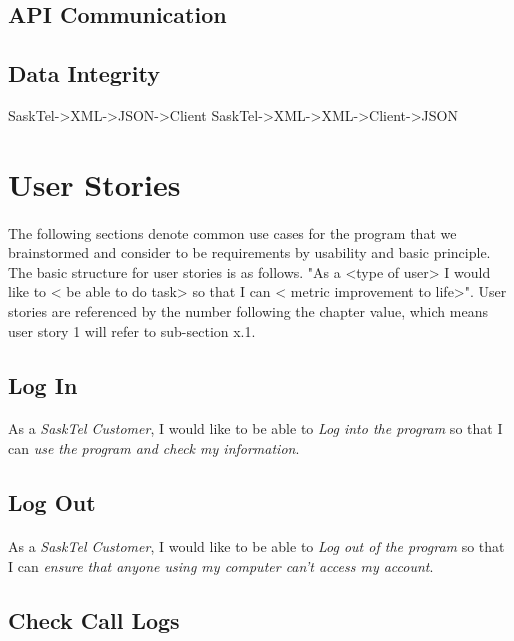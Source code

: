 \documentclass[12pt]{article}
\begin{document}
\subsection{API Communication}

\subsection{Data Integrity}
	SaskTel->XML->JSON->Client
	SaskTel->XML->XML->Client->JSON


\newpage

\section{User Stories}
\paragraph{}	The following sections denote common use cases for the program that we brainstormed and consider to be requirements by usability and basic principle. The basic structure for user stories is as follows. "As a <type of user> I would like to < be able to do task> so that I can < metric improvement to life>". User stories are referenced by the number following the chapter value, which means user story 1 will refer to sub-section x.1.

\subsection{Log In}
\paragraph{}	As a \textit{SaskTel Customer}, I would like to be able to \textit{Log into the program} so that I can \textit{use the program and check my information}.

\subsection{Log Out}
\paragraph{}	As a \textit{SaskTel Customer}, I would like to be able to \textit{Log out of the program} so that I can \textit{ensure that anyone using my computer can't access my account}.

\subsection{Check Call Logs}
\end{document}
